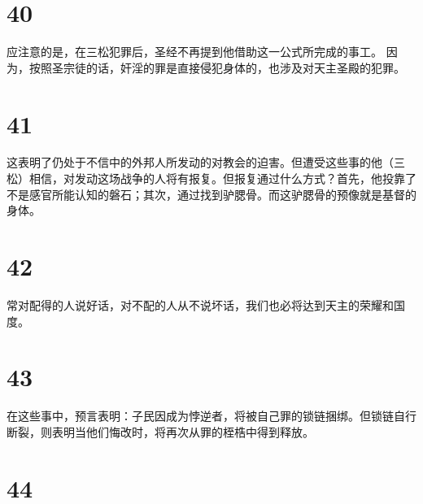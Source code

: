 
\section{40}

 应注意的是，在三松犯罪后，圣经不再提到他借助这一公式所完成的事工。 因为，按照圣宗徒的话，奸淫的罪是直接侵犯身体的，也涉及对天主圣殿的犯罪。\par


\section{41}

这表明了仍处于不信中的外邦人所发动的对教会的迫害。但遭受这些事的他（三松）相信，对发动这场战争的人将有报复。但报复通过什么方式？首先，他投靠了不是感官所能认知的磐石；其次，通过找到驴腮骨。而这驴腮骨的预像就是基督的身体。\par


\section{42}

常对配得的人说好话，对不配的人从不说坏话，我们也必将达到天主的荣耀和国度。\par


\section{43}

在这些事中，预言表明：子民因成为悖逆者，将被自己罪的锁链捆绑。但锁链自行断裂，则表明当他们悔改时，将再次从罪的桎梏中得到释放。\par


\section{44}

